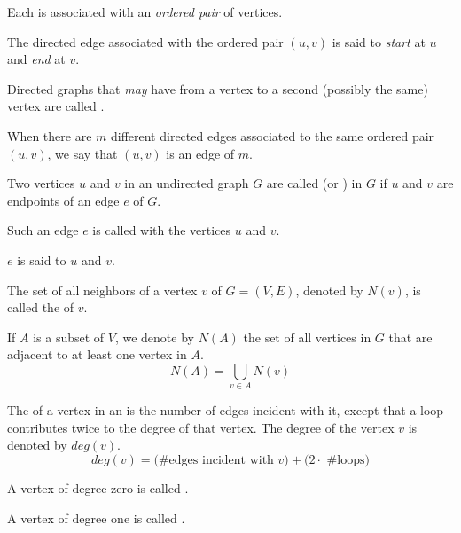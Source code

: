         \par Each  is associated with an \textit{ordered pair} of vertices.
        \par The directed edge associated with the ordered pair $(u, v)$ is said to
        \textit{start} at $u$ and \textit{end} at $v$.
        \par Directed graphs that \textit{may} have  from a vertex
        to a second (possibly the same) vertex are called .
        \par When there are $m$ different directed edges associated to the same ordered pair
        $(u, v)$, we say that $(u, v)$ is an edge of  $m$.

        \par Two vertices $u$ and $v$ in an undirected graph $G$ are called 
        (or ) in $G$ if $u$ and $v$ are endpoints of an edge $e$ of $G$.
        \par Such an edge $e$ is called  with the vertices $u$ and $v$.
        \par $e$ is said to  $u$ and $v$.
        \par The set of all neighbors of a vertex $v$ of $G = (V, E)$, denoted by $N(v)$, is
        called the  of $v$.
        \par If $A$ is a subset of $V$, we denote by $N(A)$ the set of all vertices in $G$
        that are adjacent to at least one vertex in $A$.
        \begin{equation}
            N(A) = \bigcup_{v \in A} N(v)
        \end{equation}

        \par The  of a vertex in an  is the number of
        edges incident with it, except that a loop contributes twice to the degree of that
        vertex. The degree of the vertex $v$ is denoted by $deg(v)$.
        \begin{equation}
            deg(v) = \big(\mbox{\# edges incident with } v \big) +
            \big( 2 \cdot \mbox{ \# loops} \big)
        \end{equation}
        \par A vertex of degree zero is called .
        \par A vertex of degree one is called .

